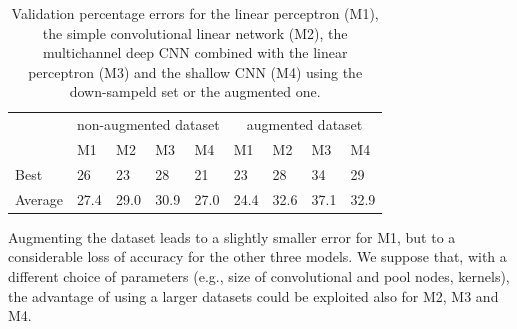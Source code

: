 \documentclass{article}
\begin{document}
 \begin{table}[h]
 \begin{center}
    \begin{tabular}{ l l l l l l l l l}
\toprule
     $ $ & \multicolumn{4}{c}{non-augmented dataset} & \multicolumn{4}{c}{augmented dataset} \\
     \cmidrule(lr){2-5}
     \cmidrule(lr){6-9}
     & M1 & M2 & M3 & M4 & M1 & M2 & M3 & M4  \\
\midrule
    Best & 26 & 23 & 28 & 21 & 23 & 28 & 34 & 29 \\
    Average & 27.4 & 29.0 & 30.9 & 27.0 & 24.4 & 32.6 & 37.1 & 32.9 \\
\bottomrule
    \end{tabular}
        \caption{Validation percentage errors for the linear perceptron (M1), the simple convolutional linear network (M2), the multichannel deep CNN combined with the linear perceptron (M3) and the shallow CNN (M4) using the down-sampeld set or the augmented one.\label{tab_results}}
\end{center}
\end{table}

Augmenting the dataset leads to a slightly smaller error for M1, but to a considerable loss of accuracy for the other three models. 
We suppose that, with a different choice of parameters (e.g., size of convolutional and pool nodes, kernels), the advantage of using a larger datasets could be exploited also for M2, M3 and M4. 
\end{document}
